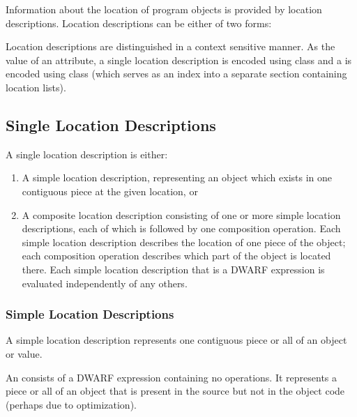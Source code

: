 Information about the location of program objects is provided
by location descriptions. Location descriptions can be either
of two forms:

Location descriptions are distinguished in a context sensitive
manner. As the value of an attribute, a
\bb
single
\eb
location description is encoded using class
\bb
\CLASSlocdesc{}
\eb
and a  is encoded
using class \CLASSloclist{} (which serves as an
index into a separate section containing location lists).

\subsection{Single Location Descriptions}
\label{chap:singlelocationdescriptions}
A single location description is either:
\begin{enumerate}[1. ]
\item A simple location description, representing an object
which
exists in one contiguous piece at the given location, or
\item A composite location description consisting of one or more
simple location descriptions, each of which is followed by
one composition operation. Each simple location description
describes the location of one piece of the object; each
composition operation describes which part of the object is
located there. Each simple location description that is a
DWARF expression is evaluated independently of any others.
\end{enumerate}


\subsubsection{Simple Location Descriptions}
\label{chap:simplelocationdesriptions}
A 
simple location description
\bb
represents
\eb
one contiguous piece or all of an object or value.

\label{chap:emptylocationdescriptions}
An 
consists of a DWARF expression
containing no operations. It represents a piece or all of an
object that is present in the source but not in the object code
(perhaps due to optimization).




